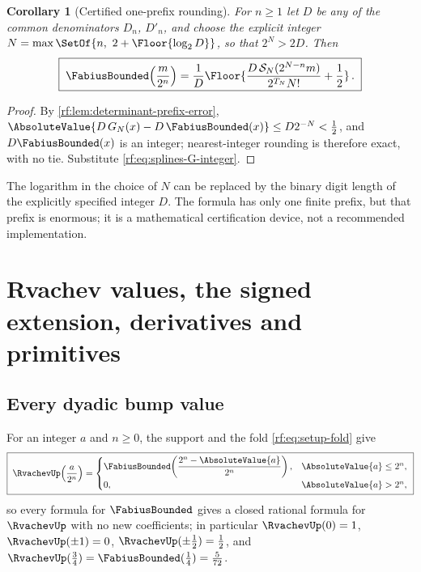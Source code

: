 \documentclass[11pt,oneside]{article}
\theoremstyle{plain}
\newtheorem{corollary}[theorem]{Corollary}
\theoremstyle{definition}
\theoremstyle{remark}
\newcommand{\Fb}{\FabiusBounded}            %
\newcommand{\up}{\RvachevUp}                %
\newcommand{\Spow}[2]{\mathcal{S}_{#1}(#2)} %
\newcommand{\Tr}[1]{T_{#1}}                 %
\begin{document}
\begin{corollary}[Certified one-prefix rounding]
\label{rf:cor:rounding}
For $n\ge1$ let $D$ be any of the common denominators $D_{n}$, $D'_{n}$,
and choose the explicit integer $N=\max\SetOf{n,\ 2+\Floor{\log_{2}D}}$, so
that $2^{N}>2D$.  Then
\begin{equation}
 \boxed{\;
 \Fb\!\left(\frac{m}{2^{n}}\right)
 =\frac{1}{D}\Floor{\frac{D\,\Spow{N}{2^{N-n}m}}{2^{\Tr{N}}N!}+\frac12}\,.\;}
 \label{rf:eq:rounding}
\end{equation}
\end{corollary}

\begin{proof}
By \cref{rf:lem:determinant-prefix-error},
$\AbsoluteValue{D\,G_{N}(x)-D\,\Fb(x)}\le D2^{-N}<\tfrac12$, and $D\Fb(x)$
is an integer; nearest-integer rounding is therefore exact, with no tie.
Substitute \cref{rf:eq:splines-G-integer}.
\end{proof}

The logarithm in the choice of $N$ can be replaced by the binary digit
length of the explicitly specified integer $D$.  The formula has only one
finite prefix, but that prefix is enormous; it is a mathematical
certification device, not a recommended implementation.

\section{Rvachev values, the signed extension, derivatives and primitives}
\label{rf:sec:rvachev}

\subsection{Every dyadic bump value}
\label{rf:sec:rvachev-fold}

For an integer $a$ and $n\ge0$, the support and the fold
\cref{rf:eq:setup-fold} give
\begin{equation}
 \boxed{\;
 \up\!\left(\frac{a}{2^{n}}\right)=
 \begin{cases}
 \Fb\!\left(\dfrac{2^{n}-\AbsoluteValue{a}}{2^{n}}\right), & \AbsoluteValue{a}\le2^{n},\\[2mm]
 0, & \AbsoluteValue{a}>2^{n},
 \end{cases}\;}
 \label{rf:eq:rvachev-fold}
\end{equation}
so every formula for $\Fb$ gives a closed rational formula for $\up$ with
no new coefficients; in particular $\up(0)=1$, $\up(\pm1)=0$,
$\up(\pm\tfrac12)=\tfrac12$, and $\up(\tfrac34)=\Fb(\tfrac14)=\tfrac5{72}$.
\end{document}
